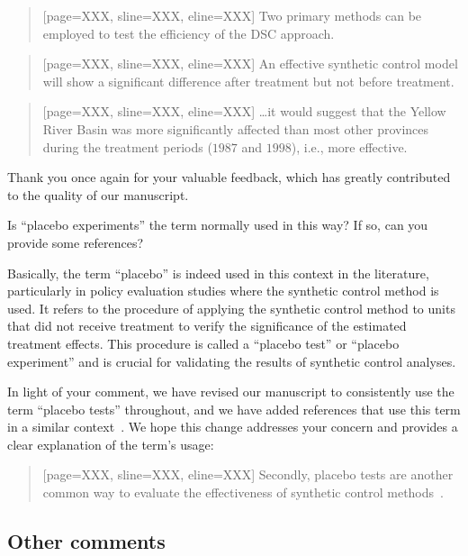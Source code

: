 \begin{quote}[page=XXX, sline=XXX, eline=XXX]
    Two primary methods can be employed to test the efficiency of the DSC approach.
\end{quote}

\begin{quote}[page=XXX, sline=XXX, eline=XXX]
    An effective synthetic control model will show a significant difference after treatment but not before treatment.
\end{quote}

\begin{quote}[page=XXX, sline=XXX, eline=XXX]
    \dots it would suggest that the Yellow River Basin was more significantly affected than most other provinces during the treatment periods ($1987$ and $1998$), i.e., more effective.
\end{quote}

\AR*{} Thank you once again for your valuable feedback, which has greatly contributed to the quality of our manuscript.

\RC{} Is ``placebo experiments'' the term normally used in this way? If so, can you provide some references?

\AR{} Basically, the term ``placebo'' is indeed used in this context in the literature, particularly in policy evaluation studies where the synthetic control method is used. It refers to the procedure of applying the synthetic control method to units that did not receive treatment to verify the significance of the estimated treatment effects. This procedure is called a ``placebo test'' or ``placebo experiment'' and is crucial for validating the results of synthetic control analyses.

\AR*{} In light of your comment, we have revised our manuscript to consistently use the term ``placebo tests'' throughout, and we have added references that use this term in a similar context~\cite{abadie2010}. We hope this change addresses your concern and provides a clear explanation of the term's usage:

\begin{quote}[page=XXX, sline=XXX, eline=XXX]
    Secondly, placebo tests are another common way to evaluate the effectiveness of synthetic control methods~\cite{abadie2010}.
\end{quote}

\subsection{Other comments}\label{sec:1-3}

